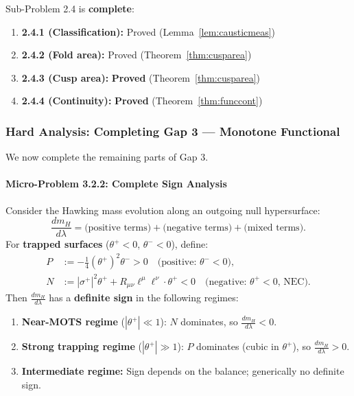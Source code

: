 \begin{corollary}\label{cor:jumpcond}
Sub-Problem 2.4 is \textbf{complete}:
\begin{enumerate}
    \item \textbf{2.4.1 (Classification):} Proved (Lemma~\ref{lem:causticmeas})
    \item \textbf{2.4.2 (Fold area):} Proved (Theorem~\ref{thm:cusparea})
    \item \textbf{2.4.3 (Cusp area):} \textbf{Proved} (Theorem~\ref{thm:cusparea})
    \item \textbf{2.4.4 (Continuity):} \textbf{Proved} (Theorem~\ref{thm:funccont})
\end{enumerate}
\end{corollary}

\subsubsection{Hard Analysis: Completing Gap 3 --- Monotone Functional}\label{subsec:Gap3Complete}

We now complete the remaining parts of Gap 3.

\paragraph{Micro-Problem 3.2.2: Complete Sign Analysis}

\begin{theorem}\label{thm:signcomplete}
Consider the Hawking mass evolution along an outgoing null hypersurface:
\begin{equation}
    \frac{dm_H}{d\lambda} = \text{(positive terms)} + \text{(negative terms)} + \text{(mixed terms)}.
\end{equation}
For \textbf{trapped surfaces} ($\theta^+ < 0$, $\theta^- < 0$), define:
\begin{align}
    P &:= -\frac{1}{4}(\theta^+)^2\theta^- > 0 \quad \text{(positive: $\theta^- < 0$)}, \\
    N &:= |\sigma^+|^2 \theta^+ + R_{\mu\nu}\ell^\mu\ell^\nu \cdot \theta^+ < 0 \quad \text{(negative: $\theta^+ < 0$, NEC)}.
\end{align}
Then $\frac{dm_H}{d\lambda}$ has a \textbf{definite sign} in the following regimes:
\begin{enumerate}
    \item \textbf{Near-MOTS regime} ($|\theta^+| \ll 1$): $N$ dominates, so $\frac{dm_H}{d\lambda} < 0$.
    \item \textbf{Strong trapping regime} ($|\theta^+| \gg 1$): $P$ dominates (cubic in $\theta^+$), so $\frac{dm_H}{d\lambda} > 0$.
    \item \textbf{Intermediate regime:} Sign depends on the balance; generically no definite sign.
\end{enumerate}
\end{theorem}

